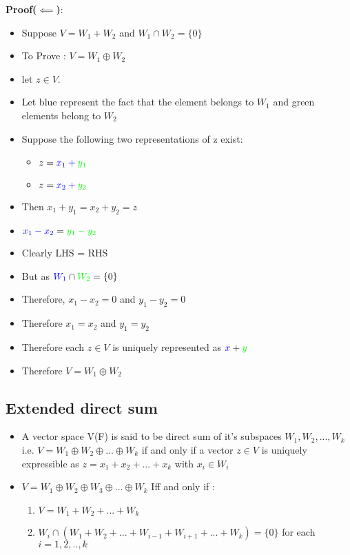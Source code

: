 \documentclass[twoside]{article}
\begin{document}
	{\bf Proof($\impliedby$)}:
	\begin{itemize}
		\item Suppose $V = W_1 + W_2$ and $W_1 \cap W_2 = \{0\}$ 
		\item To Prove : $V = W_1 \oplus W_2$
		\item let $z \in V$. 
		\item Let blue represent the fact that the element belongs to $W_1$ and green elements belong to $W_2$
		\item Suppose the following two representations of z exist:
		\begin{itemize}
			\item $z = {\color{blue}x_1 + \color{green}y_1}$ 
			\item $z = {\color{blue}x_2 + \color{green}y_2}$
		\end{itemize}
		\item Then $x_1 + y_1 = x_2 + y_2 = z$
		\item ${\color{blue}x_1 - x_2} = {\color{green}y_1 - y_2}$
		\item Clearly LHS = RHS
		\item But as ${\color{blue}W_1} \cap {\color{green}W_2} = \{0\}$
		\item Therefore, $x_1 - x_2 = 0$ and $y_1 - y_2 = 0$
		\item Therefore $x_1 = x_2$ and $y_1 = y_2$
		\item Therefore each $z \in V$ is uniquely represented as ${\color{blue}x} + {\color{green}y}$
		\item Therefore $V = W_1 \oplus W_2$
	\end{itemize}
	\subsection{Extended direct sum}
	\begin{itemize}
		\item A vector space V(F) is said to be direct sum of it's subspaces $W_1, W_2, ..., W_k$ i.e. $V = W_1 \oplus W_2 \oplus ... \oplus W_k$ if and only if a vector $z \in V$ is uniquely expressible as $z = x_1 + x_2 + ... + x_k$ with $x_i \in W_i$
		\item $V = W_1 \oplus W_2 \oplus W_3 \oplus ... \oplus W_k$ Iff and only if :
		\begin{enumerate}
			\item $V = W_1 + W_2 + ... + W_k$
			\item $W_i \cap (W_1 + W_2 + ... + W_{i-1} + W_{i+1} + ... + W_{k}) = \{0\}$ for each $i=1,2,..,k$
		\end{enumerate}
	\end{itemize}
\end{document}
